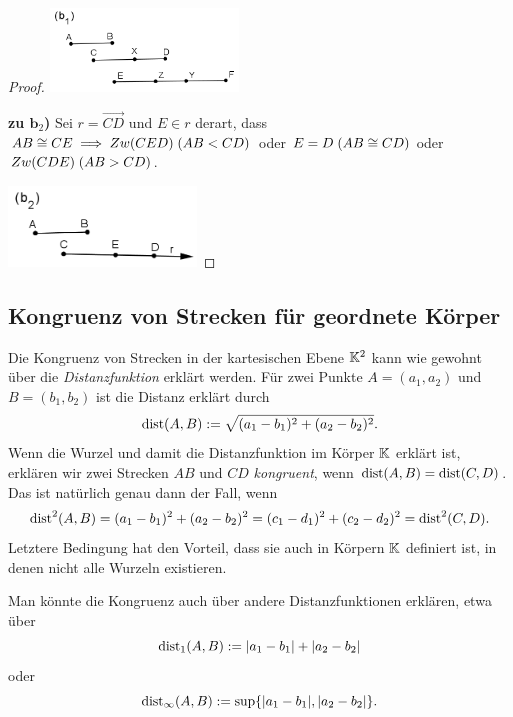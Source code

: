 \begin{proof}
\centerline{\includegraphics[width=5cm]{BILDER/1-2-06b1-Ord.png}}


{\bf zu $\mathbf b_2$)} 
Sei $r=\overrightarrow{CD}$ und $E\in r$ derart, dass
${AB}\cong{CE}\;\Longrightarrow\;Zw(CED)\;({AB}<{CD})$
oder $E=D\;({AB}\cong{CD})$ oder
$Zw(CDE)\;({AB}>{CD})$.


\centerline{\includegraphics[width=5cm]{BILDER/1-2-06b2-Ord.png}}


\end{proof}





\subsection*{Kongruenz von Strecken für geordnete Körper}

Die Kongruenz von Strecken in der kartesischen Ebene $\mathbb K^2$ kann wie
gewohnt über die {\em Distanzfunktion} erklärt werden.
Für zwei Punkte $A=(a_1,a_2)$ und $B=(b_1,b_2)$ ist die Distanz
erklärt durch
$$
\operatorname{dist}(A,B)  := \sqrt{(a_1-b_1)^2 + (a_2-b_2)^2}
.
$$
Wenn die Wurzel und damit die Distanzfunktion im Körper $\mathbb K$ erklärt
ist, erklären wir zwei Strecken $AB$ und $CD$ {\em kongruent}, wenn
$\operatorname{dist}(A,B) = \operatorname{dist}(C,D)$. Das ist natürlich genau dann der Fall, wenn
$$
\operatorname{dist}^2(A,B) = (a_1-b_1)^2 + (a_2-b_2)^2 
=
 (c_1-d_1)^2 + (c_2-d_2)^2
= \operatorname{dist}^2(C,D)
.
$$
Letztere Bedingung hat den Vorteil, dass sie auch in Körpern $\mathbb K$
definiert ist, in denen nicht alle Wurzeln existieren.

Man könnte die Kongruenz auch über andere Distanzfunktionen erklären,
etwa über
$$
\operatorname{dist}_1(A,B)  := |a_1-b_1| + |a_2-b_2|
$$
oder
$$ 
\operatorname{dist}_{\infty}(A,B)  := \sup \{ |a_1-b_1|, |a_2-b_2| \}
.
$$





